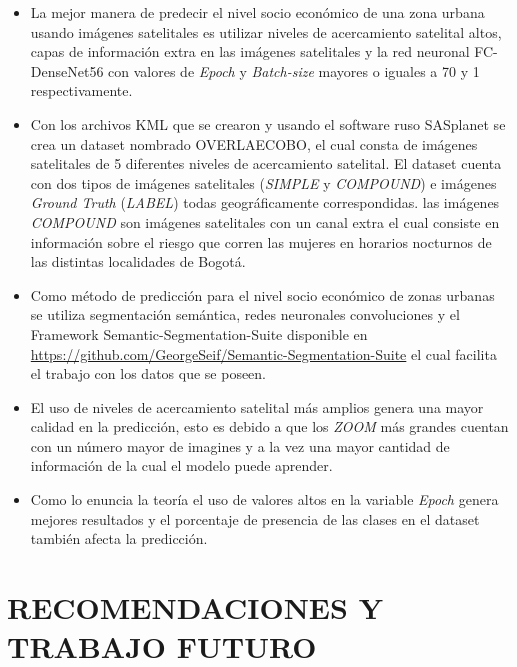 \begin{itemize}
\item La mejor manera de predecir el nivel socio económico de una zona urbana usando imágenes satelitales es utilizar niveles de acercamiento satelital altos, capas de información extra en las imágenes satelitales y la red neuronal FC-DenseNet56 con valores de \textit{Epoch} y \textit{Batch-size} mayores o iguales a 70 y 1 respectivamente. 



\item Con los archivos KML que se crearon y usando el software ruso SASplanet se crea un dataset nombrado OVERLAECOBO, el cual consta de imágenes satelitales de 5 diferentes niveles de acercamiento satelital. El dataset cuenta con dos tipos de imágenes satelitales (\textit{SIMPLE} y \textit{COMPOUND}) e imágenes \textit{Ground Truth} (\textit{LABEL}) todas geográficamente correspondidas. las imágenes \textit{COMPOUND} son imágenes satelitales con un canal extra el cual consiste en información sobre el riesgo que corren las mujeres en horarios nocturnos de las distintas localidades de Bogotá. 

\item Como método de predicción para el nivel socio económico de zonas urbanas se utiliza segmentación semántica, redes neuronales convoluciones y el Framework Semantic-Segmentation-Suite disponible en \url{https://github.com/GeorgeSeif/Semantic-Segmentation-Suite} el cual facilita el trabajo con los datos que se poseen. 

\item El uso de niveles de acercamiento satelital más amplios genera una mayor calidad en la predicción, esto es debido a que los \textit{ZOOM} más grandes cuentan con un número mayor de imagines y a la vez una mayor cantidad de información de la cual el modelo puede aprender. 

\item Como lo enuncia la teoría el uso de valores altos en la variable \textit{Epoch} genera mejores resultados y el porcentaje de presencia de las clases en el dataset también afecta la predicción. 
\end{itemize}


\newpage\chapter{RECOMENDACIONES Y TRABAJO FUTURO}
	

